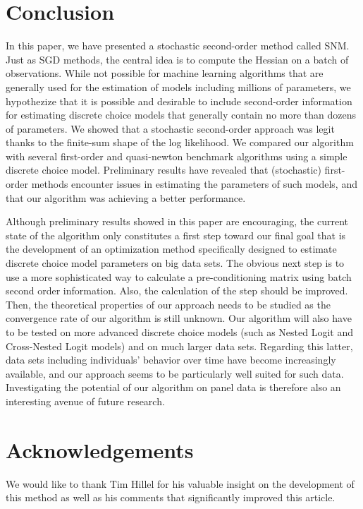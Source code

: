 \documentclass[conference]{IEEEtran}
\begin{document}
\section{Conclusion}
\label{sec:conclusion}

In this paper, we have presented a stochastic second-order method called SNM.  Just as SGD methods, the central idea is to compute the Hessian on a batch of observations. While not possible for machine learning algorithms that are generally used for the estimation of models including millions of parameters,  we hypothezize that it is possible and desirable to include second-order information for estimating discrete choice models that generally contain no more than dozens of parameters. We showed that a stochastic second-order approach was legit thanks to the finite-sum shape of the log likelihood. We compared our algorithm with several first-order and quasi-newton benchmark algorithms using a simple discrete choice model. Preliminary results have revealed that (stochastic) first-order methods encounter issues in estimating the parameters of such models, and that our algorithm was achieving a better performance.  

Although preliminary results showed in this paper are encouraging, the current state of the algorithm only constitutes a first step toward our final goal that is the development of an optimization method specifically designed to estimate discrete choice model parameters on big data sets. The obvious next step is to use a more sophisticated way to calculate a pre-conditioning matrix using batch second order information. Also, the calculation of the step should be improved. Then, the theoretical properties of our approach needs to be studied as the convergence rate of our algorithm is still unknown. Our algorithm will also have to be tested on more advanced discrete choice models (such as Nested Logit and Cross-Nested Logit models) and on much larger data sets. Regarding this latter, data sets including individuals' behavior over time have become increasingly available, and our approach seems to be particularly well suited for such data. Investigating the potential of our algorithm on panel data is therefore also an interesting avenue of future research. 


\section{Acknowledgements} 
\label{sec:acknowledgements}

We would like to thank Tim Hillel for his valuable insight on the development of this method as well as his comments that significantly improved this article.


\end{document}
